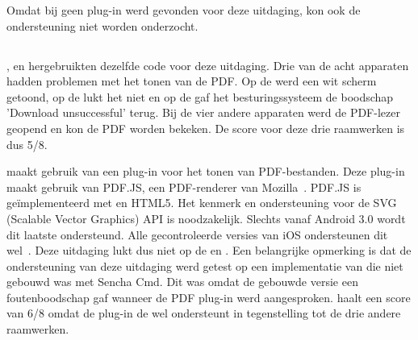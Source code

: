 Omdat bij \lungo{} geen plug-in werd gevonden voor deze uitdaging, kon ook de ondersteuning niet worden onderzocht.

% 
% 
% 
% 


\subsection{}
\label{sec:evaluatie-ondersteuning-pdf}

\kendo{}, \jqm{} en \lungo{} hergebruikten dezelfde code voor deze uitdaging.
Drie van de acht apparaten hadden problemen met het tonen van de PDF.
Op de \htc{} werd een wit scherm getoond, op de \gtab{} lukt het niet en op de \gs{} gaf het besturingssysteem de boodschap 'Download unsuccessful' terug.
Bij de vier andere apparaten werd de PDF-lezer geopend en kon de PDF worden bekeken.
De score voor deze drie raamwerken is dus 5/8.

\st{} maakt gebruik van een plug-in voor het tonen van PDF-bestanden.
Deze plug-in maakt gebruik van PDF.JS,  een PDF-renderer van Mozilla~\cite{Gal2010}.
PDF.JS is geïmplementeerd met \js{} en HTML5.
Het  kenmerk en ondersteuning voor de SVG (Scalable Vector Graphics) API is noodzakelijk.
Slechts vanaf Android 3.0 wordt dit laatste ondersteund.
Alle gecontroleerde versies van iOS ondersteunen dit wel~\cite{Deveria2013c}.
Deze uitdaging lukt dus niet op de \htc{} en \gtab{}.
Een belangrijke opmerking is dat de ondersteuning van deze uitdaging werd getest op een implementatie van \st{} die niet gebouwd was met Sencha Cmd.
Dit was omdat de gebouwde versie een foutenboodschap gaf wanneer de PDF plug-in werd aangesproken.
\st{} haalt een score van 6/8 omdat de plug-in de \gs{} wel ondersteunt in tegenstelling tot de drie andere raamwerken.

